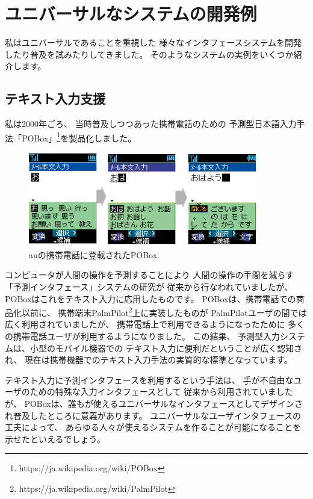 \documentclass[topics]{compsoft} %
\begin{document}
\section{ユニバーサルなシステムの開発例}

私はユニバーサルであることを重視した
様々なインタフェースシステムを開発したり普及を試みたりしてきました。
そのようなシステムの実例をいくつか紹介します。

\subsection{テキスト入力支援}

私は2000年ごろ、
当時普及しつつあった携帯電話のための
予測型日本語入力手法「POBox」\footnote{
  \textsf{https:{\slash}{\slash}ja.wikipedia.org{\slash}wiki{\slash}POBox}
}を製品化しました。

\begin{figure}[h]
  \includegraphics[width=10cm,bb=0 0 404 167]{figures/ac2b347a7042f920edd576ee07c4b7f4.png}
  \caption{auの携帯電話に登載されたPOBox.}
  \label{pobox}
\end{figure}

コンピュータが人間の操作を予測することにより
人間の操作の手間を減らす「予測インタフェース」システムの研究が
従来から行なわれていましたが\cite{WatchWhatIDo}\cite{YourWish}、
POBoxはこれをテキスト入力に応用したものです。
%
POBoxは、携帯電話での商品化以前に、
携帯端末PalmPilot\footnote{
  \textsf{https:{\slash}{\slash}ja.wikipedia.org{\slash}wiki{\slash}PalmPilot}
}上に実装したものが
PalmPilotユーザの間では広く利用されていましたが、
携帯電話上で利用できるようになったために
多くの携帯電話ユーザが利用するようになりました。
この結果、
予測型入力システムは、小型のモバイル機器での
テキスト入力に便利だということが広く認知され、
現在は携帯機器でのテキスト入力手法の実質的な標準となっています。

テキスト入力に予測インタフェースを利用するという手法は、
手が不自由なユーザのための特殊な入力インタフェースとして
従来から利用されていましたが、
POBoxは、誰もが使えるユニバーサルなインタフェースとしてデザインされ普及したところに意義があります。
ユニバーサルなユーザインタフェースの工夫によって、
あらゆる人々が使えるシステムを作ることが可能になることを示せたといえるでしょう。
\end{document}
